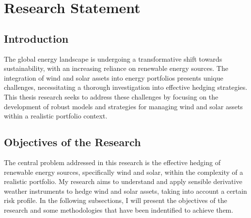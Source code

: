 

%

\chapter{Research Statement}
\label{ch:research-statement}

\glsresetall

\section{Introduction}
\label{sec:rs_intro}

    The global energy landscape is undergoing a transformative shift towards sustainability,
    with an increasing reliance on renewable energy sources.
    The integration of wind and solar assets into energy portfolios presents unique challenges,
    necessitating a thorough investigation into effective hedging strategies.
    This thesis research seeks to address these challenges by focusing on the development of robust models and strategies
    for managing wind and solar assets within a realistic portfolio context.

\section{Objectives of the Research}
    \label{sec:rs_objectives}


    The central problem addressed in this research is the effective hedging of renewable energy sources,
    specifically wind and solar, within the complexity of a realistic portfolio.
    My research aims to understand and apply sensible derivative weather instruments to hedge wind and solar assets,
    taking into account a certain risk profile.
    In the following subsections, I will present the objectives of the research and some methodologies that have been
    indentified to achieve them.

